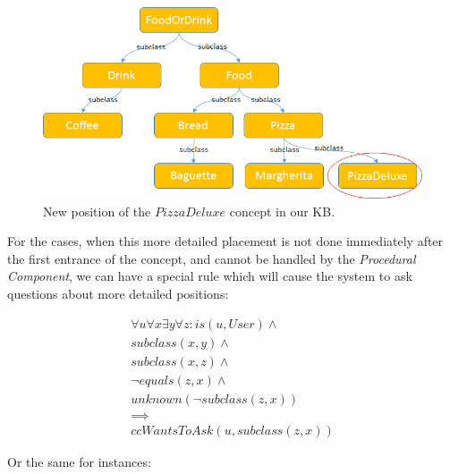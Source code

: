\begin{figure}[H]
	\centering
		\includegraphics[width=1\textwidth]{figures/kbCorrectPosition.png}
	\caption{New position of the $PizzaDeluxe$ concept in our KB.}
	\label{fig:kbCorrectPosition}
\end{figure}

For the cases, when this more detailed placement is not done immediately after
the first entrance of the concept, and cannot be handled by the 
\emph{Procedural Component}, we can have a special rule which will cause
the system to ask questions about more detailed positions:

\begin{equation}\label{rule:autoSubclass}
\begin{gathered}
 \forall u \forall x \exists y \forall z:
 is (u,User) \land \\
 subclass(x,y) \land \\
 subclass(x,z) \land \\
 \lnot equals(z,x) \land \\
 unknown(\lnot subclass(z,x)) \\
 \implies\\
 ccWantsToAsk(u,subclass(z,x))
\end{gathered}
\end{equation}

Or the same for instances: 

